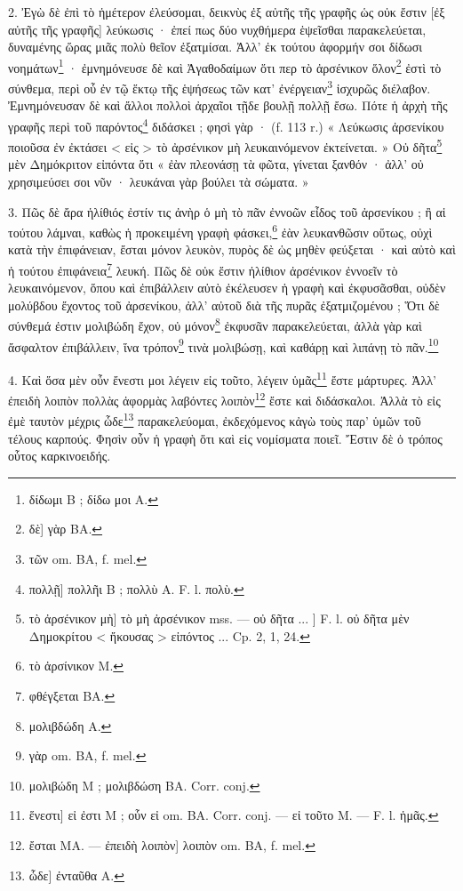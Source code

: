 \documentclass[landscape, a4paper, 11pt, oneside, polutonikogreek, french]{article}
\begin{document}
2. Ἐγὼ δὲ ἐπὶ τὸ ἡμέτερον ἐλεύσομαι, δεικνὺς ἐξ αὐτῆς τῆς γραφῆς ὡς οὐκ ἔστιν [ἐξ αὐτῆς τῆς γραφῆς] λεύκωσις · ἐπεί πως δύο νυχθήμερα ἑψεῖσθαι παρακελεύεται, δυναμένης ὥρας μιᾶς πολὺ θεῖον ἐξατμίσαι. Ἀλλ' ἐκ τούτου ἀφορμήν σοι δίδωσι νοημάτων\footnote{δίδωμι B ; δίδω μοι A.} · ἐμνημόνευσε δὲ καὶ Ἀγαθοδαίμων ὅτι περ τὸ ἀρσένικον ὅλον\footnote{δὲ] γὰρ BA.} ἐστὶ τὸ σύνθεμα, περὶ οὗ ἐν τῷ ἕκτῳ τῆς ἑψήσεως τῶν κατ' ἐνέργειαν\footnote{τῶν om. BA, f. mel.} ἰσχυρῶς διέλαβον. Ἐμνημόνευσαν δὲ καὶ ἄλλοι πολλοὶ ἀρχαῖοι τῇδε βουλῇ πολλῇ ἔσω. Πότε ἡ ἀρχὴ τῆς γραφῆς περὶ τοῦ παρόντος\footnote{πολλῇ] πολλῆι B ; πολλὺ A. F. l. πολὺ.} διδάσκει ; φησὶ γὰρ · (f. 113 r.) « Λεύκωσις ἀρσενίκου ποιοῦσα ἐν ἐκτάσει < εἰς > τὸ ἀρσένικον μὴ λευκαινόμενον ἐκτείνεται. » Οὐ δῆτα\footnote{τὸ ἀρσένικον μὴ] τὸ μὴ ἀρσένικον mss. --- οὐ δῆτα ... ] F. l. οὐ δῆτα μὲν Δημοκρίτου < ἤκουσας > εἰπόντος ... Cp. 2, 1, 24.} μὲν Δημόκριτον εἰπόντα ὅτι « ἐὰν πλεονάσῃ τὰ φῶτα, γίνεται ξανθόν · ἀλλ' οὐ χρησιμεύσει σοι νῦν · λευκάναι γὰρ βούλει τὰ σώματα. »

3. Πῶς δὲ ἄρα ἡλίθιός ἐστίν τις ἀνὴρ ὁ μὴ τὸ πᾶν ἐννοῶν εἶδος τοῦ ἀρσενίκου ; ἢ αἱ τούτου λάμναι, καθὼς ἡ προκειμένη γραφὴ φάσκει,\footnote{τὸ ἀρσίνικον M.} ἐὰν λευκανθῶσιν οὕτως, οὐχὶ κατὰ τὴν ἐπιφάνειαν, ἔσται μόνον λευκὸν, πυρὸς δὲ ὡς μηθὲν φεύξεται · καὶ αὐτὸ καὶ ἡ τούτου ἐπιφάνεια\footnote{φθέγξεται BA.} λευκή. Πῶς δὲ οὐκ ἔστιν ἠλίθιον ἀρσένικον ἐννοεῖν τὸ λευκαινόμενον, ὅπου καὶ ἐπιβάλλειν αὐτὸ ἐκέλευσεν ἡ γραφὴ καὶ ἐκφυσᾶσθαι, οὐδὲν μολύβδου ἔχοντος τοῦ ἀρσενίκου, ἀλλ' αὐτοῦ διὰ τῆς πυρᾶς ἐξατμιζομένου ; Ὅτι δὲ σύνθεμά ἐστιν μολιβώδη ἔχον, οὐ μόνον\footnote{μολιβδώδη A.} ἐκφυσᾶν παρακελεύεται, ἀλλὰ γὰρ καὶ ἄσφαλτον ἐπιβάλλειν, ἵνα τρόπον\footnote{γὰρ om. BA, f. mel.} τινὰ μολιβώσῃ, καὶ καθάρῃ καὶ λιπάνῃ τὸ πᾶν.\footnote{μολιβώδη M ; μολιβδώση BA. Corr. conj.}

4. Καὶ ὅσα μὲν οὖν ἔνεστι μοι λέγειν εἰς τοῦτο, λέγειν ὑμᾶς\footnote{ἕνεστι] εἰ ἐστι M ; οὗν εἰ om. BA. Corr. conj. --- εἰ τοῦτο M. --- F. l. ἡμᾶς.} ἔστε μάρτυρες. Ἀλλ' ἐπειδὴ λοιπὸν πολλὰς ἀφορμὰς λαβόντες λοιπὸν\footnote{ἔσται MA. --- ἐπειδὴ λοιπὸν] λοιπὸν om. BA, f. mel.} ἔστε καὶ διδάσκαλοι. Ἀλλὰ τὸ εἰς ἐμὲ ταυτὸν μέχρις ὧδε\footnote{ὧδε] ἐνταῦθα A.} παρακελεύομαι, ἐκδεχόμενος κἀγὼ τοὺς παρ' ὑμῶν τοῦ τέλους καρπούς. Φησὶν οὖν ἡ γραφὴ ὅτι καὶ εἰς νομίσματα ποιεῖ. Ἔστιν δὲ ὁ τρόπος οὗτος καρκινοειδής.
\end{document}
